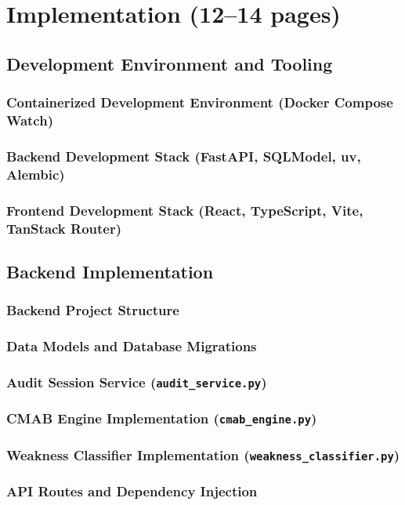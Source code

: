 \documentclass[a4paper, 12pt, oneside, openany, BCOR1cm,toc=chapterentrywithdots]{scrbook}
\begin{document}
\chapter{Implementation (12--14 pages)}
\label{chap:implementation}
% 
\section{Development Environment and Tooling}
\subsection{Containerized Development Environment (Docker Compose Watch)}
\subsection{Backend Development Stack (FastAPI, SQLModel, uv, Alembic)}
\subsection{Frontend Development Stack (React, TypeScript, Vite, TanStack Router)}
\section{Backend Implementation}
\subsection{Backend Project Structure}
\subsection{Data Models and Database Migrations}
\subsection{Audit Session Service (\texttt{audit\_service.py})}
\subsection{CMAB Engine Implementation (\texttt{cmab\_engine.py})}
\subsection{Weakness Classifier Implementation (\texttt{weakness\_classifier.py})}
\subsection{API Routes and Dependency Injection}
\end{document}
